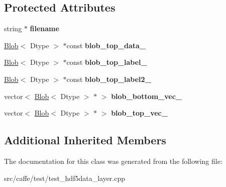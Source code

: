\subsection*{Protected Attributes}
\begin{DoxyCompactItemize}
\item 
\mbox{\label{classcaffe_1_1_h_d_f5_data_layer_test_ad9bbf0cadec32fb93ced6de4678e3753}} 
string $\ast$ {\bfseries filename}
\item 
\mbox{\label{classcaffe_1_1_h_d_f5_data_layer_test_aa5aa57ffde2bd1542c46b41759a838ff}} 
\mbox{\hyperlink{classcaffe_1_1_blob}{Blob}}$<$ Dtype $>$ $\ast$const {\bfseries blob\+\_\+top\+\_\+data\+\_\+}
\item 
\mbox{\label{classcaffe_1_1_h_d_f5_data_layer_test_ac19f12b190fb07235f25e964d39da86b}} 
\mbox{\hyperlink{classcaffe_1_1_blob}{Blob}}$<$ Dtype $>$ $\ast$const {\bfseries blob\+\_\+top\+\_\+label\+\_\+}
\item 
\mbox{\label{classcaffe_1_1_h_d_f5_data_layer_test_a8c295f35c67ad836ef6375056e06bee6}} 
\mbox{\hyperlink{classcaffe_1_1_blob}{Blob}}$<$ Dtype $>$ $\ast$const {\bfseries blob\+\_\+top\+\_\+label2\+\_\+}
\item 
\mbox{\label{classcaffe_1_1_h_d_f5_data_layer_test_a23fffe6a6f4683bcbfab15b604455423}} 
vector$<$ \mbox{\hyperlink{classcaffe_1_1_blob}{Blob}}$<$ Dtype $>$ $\ast$ $>$ {\bfseries blob\+\_\+bottom\+\_\+vec\+\_\+}
\item 
\mbox{\label{classcaffe_1_1_h_d_f5_data_layer_test_a554a84d5365d44b66acd6dbc4b235a69}} 
vector$<$ \mbox{\hyperlink{classcaffe_1_1_blob}{Blob}}$<$ Dtype $>$ $\ast$ $>$ {\bfseries blob\+\_\+top\+\_\+vec\+\_\+}
\end{DoxyCompactItemize}
\subsection*{Additional Inherited Members}


The documentation for this class was generated from the following file\+:\begin{DoxyCompactItemize}
\item 
src/caffe/test/test\+\_\+hdf5data\+\_\+layer.\+cpp\end{DoxyCompactItemize}
